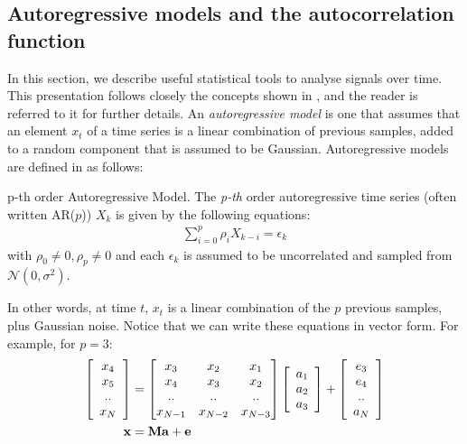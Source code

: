 \documentclass[../main.tex]{subfiles}
\begin{document}
\subsection{Autoregressive models and the autocorrelation function} \label{subsection_autoregression}
In this section, we describe useful statistical tools to analyse signals over time. This presentation follows closely the concepts shown in \cite{Roberts2014}, and the reader is referred to it for further details. An \emph{autoregressive model} is one that assumes that an element $x_t$ of a time series is a linear combination of previous samples, added to a random component that is assumed to be Gaussian. Autoregressive models are defined in \cite{Johnston} as follows:
\begin{definition}{p-th order Autoregressive Model.} \label{def_ar}
The \emph{p-th} order autoregressive time series (often written AR($p$)) $X_k$ is given by the following equations:
\begin{align*}
\sum_{i=0}^p{\rho_iX_{k-i}} = \epsilon_k
\end{align*}
with $\rho_0 \neq 0, \rho_p \neq 0$ and each $\epsilon_k$ is assumed to be uncorrelated and sampled from $\mathcal{N}(0, \sigma^2)$.
\end{definition}
\par In other words, at time $t$, $x_t$ is a linear combination of the $p$ previous samples, plus Gaussian noise. Notice that we can write these equations in vector form. For example, for $p=3$:
\begin{align*}
\left[ \begin{array}{c} x_4 \\ x_5 \\ .. \\ x_N  \end{array} \right] &= \begin{bmatrix} x_3 & x_2 & x_1 \\ x_4 & x_3 & x_2 \\ .. & .. & .. \\ x_{N-1} & x_{N-2} & x_{N-3} \end{bmatrix} \left[ \begin{array}{c} a_1 \\ a_2 \\ a_3 \end{array} \right] + \left[ \begin{array}{c} e_3 \\ e_4 \\ .. \\ a_N \end{array}
\right]\\
\mathbf{x} &= \mathbf{Ma} + \mathbf{e}
\end{align*}
\end{document}
